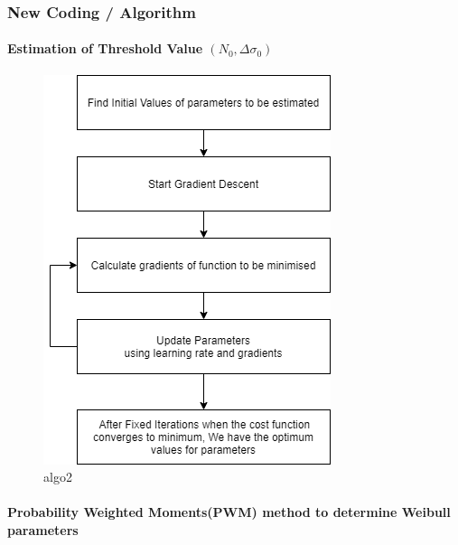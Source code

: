 \documentclass[11pt]{article}
\begin{document}
\hypertarget{new-coding-algorithm}{%
\subsubsection{New Coding / Algorithm}\label{new-coding-algorithm}}
\begin{center}
\hypertarget{estimation-of-threshold-value-n_0deltasigma_0}{%
\paragraph{\texorpdfstring{Estimation of Threshold Value
\((N_0,\Delta\sigma_0)\)}{Estimation of Threshold Value (N\_0,\textbackslash{}Delta\textbackslash{}sigma\_0)}}
\label{estimation-of-threshold-value-n_0deltasigma_0}}

\begin{figure}
\centering
\includegraphics[scale=0.69]{images/algo2.png}
\caption{algo2}
\end{figure}

\hypertarget{probability-weighted-momentspwm-method-to-determine-weibull-parameters-1}{%
\paragraph{Probability Weighted Moments(PWM) method to determine Weibull
parameters}\label{probability-weighted-momentspwm-method-to-determine-weibull-parameters-1}}


\end{center}
\end{document}
